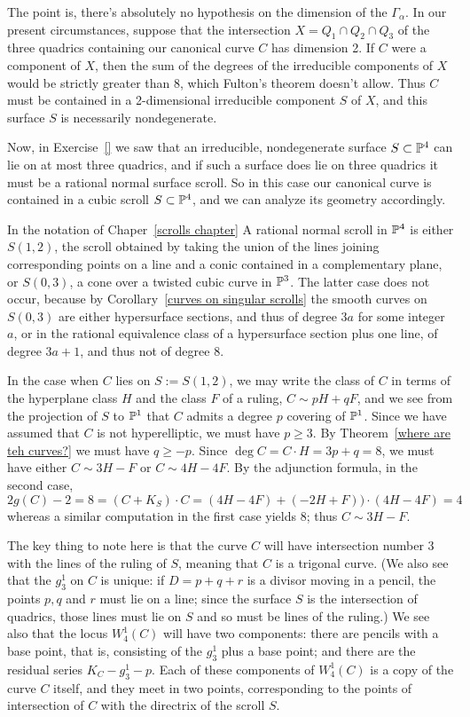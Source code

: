 The point is, there's absolutely no hypothesis on the dimension of the $\Gamma_\alpha$. In our present circumstances, suppose that the intersection $X = Q_1 \cap Q_2 \cap Q_3$ of the three quadrics containing our canonical curve $C$ has dimension 2. If $C$ were a component of $X$, then the sum of the degrees of the irreducible components of $X$ would be strictly greater than 8, which Fulton's theorem doesn't allow. Thus $C$ must be contained in a 2-dimensional irreducible component  $S$ of $X$, and this surface $S$ is necessarily nondegenerate.

Now, in Exercise~\ref{} we saw 
 that an irreducible, nondegenerate surface $S \subset {\mathbb P}^4$ can lie on at most three quadrics, and if such a surface does lie on three quadrics it must be a rational normal surface scroll. So in this case our canonical curve is contained in a cubic scroll $S \subset {\mathbb P}^4$, and we can analyze its geometry accordingly.

In the notation of Chaper~\ref{scrolls chapter} A rational normal scroll in ${\mathbb P}^4$ is either
$S(1,2)$, the scroll obtained by taking the union of the lines joining corresponding points on a line and a conic contained in a complementary plane, or $S(0,3)$, a cone over a twisted cubic curve in ${\mathbb P}^3$. The latter case does not occur, because by Corollary~\ref{curves on singular scrolls} the smooth curves on $S(0,3)$ are either hypersurface sections, and thus of degree $3a$ for
some integer $a$, or in the rational equivalence class of a hypersurface section plus one line,
of degree $3a+1$, and thus not of degree 8.

In the case when $C$ lies on $S := S(1,2)$, we may write the class of $C$ in terms of the hyperplane class $H$ and the class $F$ of a ruling, $C\sim pH+qF$, and we see from the 
projection of $S$ to ${\mathbb P}^1$ that $C$ admits
a degree $p$ covering of ${\mathbb P}^1$. Since we have assumed that $C$ is not hyperelliptic,
we must have $p\geq 3$. By Theorem~\ref{where are teh curves?} we must have
$q\geq -p$. Since $\deg C = C\cdot H = 3p+q = 8$, we must have either 
$C\sim 3H-F$ or $C\sim 4H-4F$. By the adjunction formula, in the second case,
$$
2g(C)-2 = 8 = (C+K_S)\cdot C = (4H-4F)+(-2H+F))\cdot(4H-4F) =4
$$
whereas a similar computation in the first case yields 8; thus $C\sim 3H-F$.

The key thing to note here is that the curve $C$ will have intersection number 3 with the lines of the ruling of $S$, meaning that $C$ is a trigonal curve. (We also see that the $g^1_3$ on $C$ is unique: if $D = p + q + r$ is a divisor moving in a pencil, the points $p, q$ and $r$ must lie on a line; since the surface $S$ is the intersection of quadrics, those lines must lie on $S$ and so must be  lines  of the ruling.) We see also that the locus $W^1_4(C)$ will have two components: there are pencils with a base point, that is, consisting of the $g^1_3$ plus a base point; and there are the residual series $K_C - g^1_3 - p$. Each of these components of $W^1_4(C)$ is a copy of the curve $C$ itself, and they meet in two points, corresponding to the points of intersection of $C$ with the directrix of the scroll $S$.

